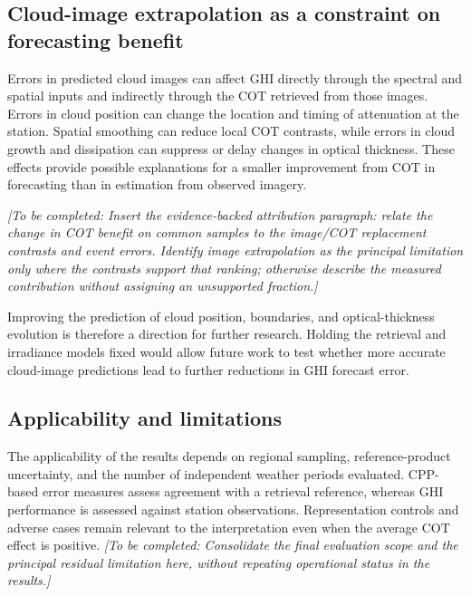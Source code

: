 \documentclass[11pt]{article}
\newcommand{\pending}[1]{\textit{[To be completed: #1]}}
\begin{document}
\subsection{Cloud-image extrapolation as a constraint on forecasting benefit}
Errors in predicted cloud images can affect GHI directly through the spectral and spatial inputs and indirectly through the COT retrieved from those images. Errors in cloud position can change the location and timing of attenuation at the station. Spatial smoothing can reduce local COT contrasts, while errors in cloud growth and dissipation can suppress or delay changes in optical thickness. These effects provide possible explanations for a smaller improvement from COT in forecasting than in estimation from observed imagery.

\pending{Insert the evidence-backed attribution paragraph: relate the change in COT benefit on common samples to the image/COT replacement contrasts and event errors. Identify image extrapolation as the principal limitation only where the contrasts support that ranking; otherwise describe the measured contribution without assigning an unsupported fraction.}

Improving the prediction of cloud position, boundaries, and optical-thickness evolution is therefore a direction for further research. Holding the retrieval and irradiance models fixed would allow future work to test whether more accurate cloud-image predictions lead to further reductions in GHI forecast error.

\subsection{Applicability and limitations}
The applicability of the results depends on regional sampling, reference-product uncertainty, and the number of independent weather periods evaluated. CPP-based error measures assess agreement with a retrieval reference, whereas GHI performance is assessed against station observations. Representation controls and adverse cases remain relevant to the interpretation even when the average COT effect is positive. \pending{Consolidate the final evaluation scope and the principal residual limitation here, without repeating operational status in the results.}
\end{document}
